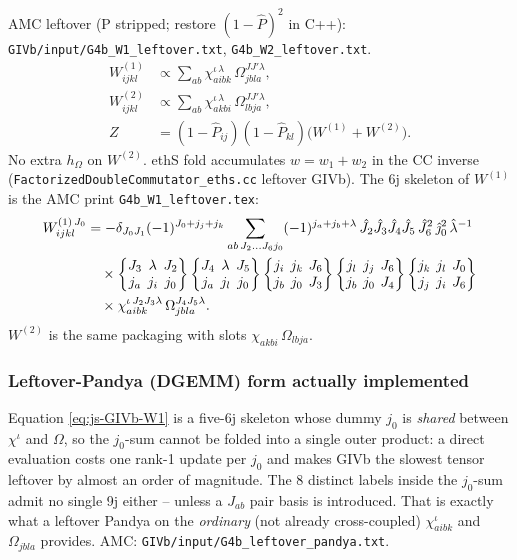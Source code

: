 \documentclass[enabledeprecatedfontcommands]{scrartcl}
\newcommand{\codename}[1]{\texttt{#1}}
\newcommand{\sixj}[6]{\begingroup\setlength{\arraycolsep}{0.2em}%
  \begin{Bmatrix} #1 & #2 & #3 \\ #4 & #5 & #6 \end{Bmatrix}\endgroup}
\begin{document}
AMC leftover (P stripped; restore $(1-\hat P)^2$ in C++):
\codename{GIVb/input/G4b\_W1\_leftover.txt},
\codename{G4b\_W2\_leftover.txt}.
\begin{equation}\label{eq:js-GIVb}
\begin{aligned}
W^{(1)}_{ijkl}
&\propto
\sum_{ab}
\chi^{\iota\,\lambda}_{aibk}\,
\Omega^{J J'\lambda}_{jbla},\\
W^{(2)}_{ijkl}
&\propto
\sum_{ab}
\chi^{\iota\,\lambda}_{akbi}\,
\Omega^{J J'\lambda}_{lbja},\\
Z
&=(1-\hat P_{ij})(1-\hat P_{kl})\bigl(W^{(1)}+W^{(2)}\bigr).
\end{aligned}
\end{equation}
No extra $h_\Omega$ on $W^{(2)}$. ethS fold accumulates
$w=w_1+w_2$ in the CC inverse
(\codename{FactorizedDoubleCommutator\_eths.cc} leftover GIVb).
The 6j skeleton of $W^{(1)}$ is the AMC print
\codename{G4b\_W1\_leftover.tex}:
\begin{equation}\label{eq:js-GIVb-W1}
\begin{aligned}
W^{(1)\,J_0}_{ijkl}
&=
-\delta_{J_0 J_1}(-1)^{J_0+j_j+j_k}
\sum_{ab\,J_2\ldots J_6 j_0}
(-1)^{j_a+j_b+\lambda}\,
\hat J_2\hat J_3\hat J_4\hat J_5\,\hat J_6^{2}\,\hat\jmath_0^{2}\,\hat\lambda^{-1}
\\
&\quad\times
\sixj{J_3}{\lambda}{J_2}{j_a}{j_i}{j_0}
\sixj{J_4}{\lambda}{J_5}{j_a}{j_l}{j_0}
\sixj{j_i}{j_k}{J_6}{j_b}{j_0}{J_3}
\sixj{j_l}{j_j}{J_6}{j_b}{j_0}{J_4}
\sixj{j_k}{j_l}{J_0}{j_j}{j_i}{J_6}
\\
&\quad\times
\chi^{\iota\,J_2 J_3\lambda}_{aibk}\,
\Omega^{J_4 J_5\lambda}_{jbla}.
\end{aligned}
\end{equation}
$W^{(2)}$ is the same packaging with slots $\chi_{akbi}\,\Omega_{lbja}$.

\subsubsection{Leftover-Pandya (DGEMM) form actually implemented}
\label{sec:js-GIVb-pandya}

Equation \eqref{eq:js-GIVb-W1} is a five-6j skeleton whose dummy
$j_0$ is \emph{shared} between $\chi^\iota$ and $\Omega$, so the
$j_0$-sum cannot be folded into a single outer product: a direct
evaluation costs one rank-1 update per $j_0$ and makes GIVb the
slowest tensor leftover by almost an order of magnitude. The 8
distinct labels inside the $j_0$-sum admit no single 9j either --
unless a $J_{ab}$ pair basis is introduced. That is exactly what a
leftover Pandya on the \emph{ordinary} (not already cross-coupled)
$\chi^\iota_{aibk}$ and $\Omega_{jbla}$ provides. AMC:
\codename{GIVb/input/G4b\_leftover\_pandya.txt}.
\end{document}
